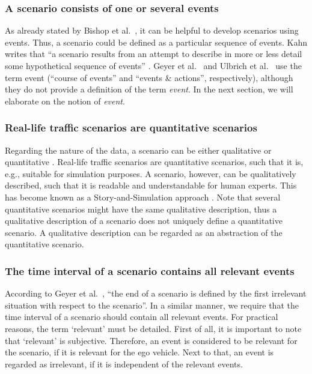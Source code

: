 \subsubsection{A scenario consists of one or several events \cite{vannotten2003updated, go2004blind, geyer2014, ulbrich2015, kahn1962, englund2016grand, schoemaker1993multiple, cuppens2002alert}}
As already stated by Bishop et al.\ \cite{bishop2007scentechniques}, it can be helpful to develop scenarios using events. Thus, a scenario could be defined as a particular sequence of events.  Kahn writes that ``a scenario results from an attempt to describe in more or less detail some hypothetical sequence of events'' \cite{kahn1962}. Geyer et al.\ \cite{geyer2014} and Ulbrich et al.\ \cite{ulbrich2015} use the term event (``course of events'' and ``events \& actions'', respectively), although they do not provide a definition of the term \emph{event}. In the next section, we will elaborate on the notion of \emph{event}.

\subsubsection{Real-life traffic scenarios are quantitative scenarios}
Regarding the nature of the data, a scenario can be either qualitative or quantitative \cite{vannotten2003updated}. Real-life traffic scenarios are quantitative scenarios, such that it is, e.g., suitable for simulation purposes. A scenario, however, can be qualitatively described, such that it is readable and understandable for human experts. This has become known as a Story-and-Simulation approach \cite{alcamo2001scenarios}. Note that several quantitative scenarios might have the same qualitative description, thus a qualitative description of a scenario does not uniquely define a quantitative scenario. A qualitative description can be regarded as an abstraction of the quantitative scenario.
	
\subsubsection{The time interval of a scenario contains all relevant events}
According to Geyer et al.\ \cite{geyer2014}, ``the end of a scenario is defined by the first irrelevant situation with respect to the scenario''. In a similar manner, we require that the time interval of a scenario should contain all relevant events. For practical reasons, the term `relevant' must be detailed. First of all, it is important to note that `relevant' is subjective. Therefore, an event is considered to be relevant for the scenario, if it is relevant for the ego vehicle. Next to that, an event is regarded as irrelevant, if it is independent of the relevant events.
	
